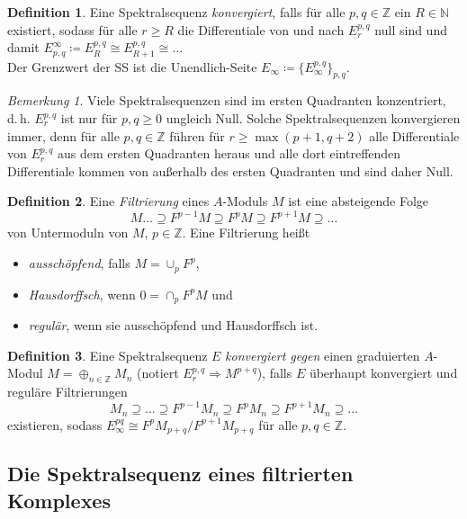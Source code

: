 \documentclass[11pt, a4paper, german]{article}
\theoremstyle{definition}
\newtheorem*{defn}{Definition}
\theoremstyle{remark}
\newtheorem*{bem}{Bemerkung}
\newcommand{\N}{\mathbb{N}} %
\newcommand{\Z}{\mathbb{Z}} %
\renewcommand{\dh}{d.\,h.} %
\begin{document}
\begin{defn}
  Eine Spektralsequenz \emph{konvergiert}, falls für alle $p, q \in \Z$ ein $R \in \N$ existiert, sodass für alle $r \geq R$ die Differentiale von und nach $E_r^{p,q}$ null sind und damit $E^\infty_{p,q} \coloneqq E_R^{p,q} \cong E_{R+1}^{p,q} \cong \ldots$ \\[2pt]
  Der Grenzwert der SS ist die Unendlich-Seite $E_\infty \coloneqq \{ E_\infty^{p,q} \}_{p,q}$.
\end{defn}

\begin{bem}
  Viele Spektralsequenzen sind im ersten Quadranten konzentriert, \dh{} $E_r^{p,q}$ ist nur für $p, q \geq 0$ ungleich Null.
  Solche Spektralsequenzen konvergieren immer, denn für alle $p, q \in \Z$ führen für $r \geq \max(p+1, q+2)$ alle Differentiale von $E_r^{p,q}$ aus dem ersten Quadranten heraus und alle dort eintreffenden Differentiale kommen von außerhalb des ersten Quadranten und sind daher Null.
\end{bem}

\begin{defn}
  Eine \emph{Filtrierung} eines $A$-Moduls $M$ ist eine absteigende Folge
  \[ M \ldots \supseteq F^{p-1} M \supseteq F^p M \supseteq F^{p+1} M \supseteq \ldots \]
  von Untermoduln von $M$, $p \!\in\! \Z$.
  Eine Filtrierung heißt
  \begin{itemize}
    \item \emph{ausschöpfend}, falls $M = \cup_p F^p$,
    \item \emph{Hausdorffsch}, wenn $0 = \cap_p F^p M$ und
    \item \emph{regulär}, wenn sie ausschöpfend und Hausdorffsch ist.
  \end{itemize}
\end{defn}

\begin{defn}
  Eine Spektralsequenz $E$ \emph{konvergiert gegen} einen graduierten $A$-Modul $M = \oplus_{n \in \Z} M_n$ (notiert $E_r^{p,q} \Rightarrow M^{p+q}$), falls $E$ überhaupt konvergiert und reguläre Filtrierungen
  \[ M_n \supseteq \ldots \supseteq F^{p-1} M_n \supseteq F^p M_n \supseteq F^{p+1} M_n \supseteq \ldots \]
  existieren, sodass $E_\infty^{pq} \cong F^p M_{p+q} / F^{p+1} M_{p+q}$ für alle $p, q \in \Z$.
\end{defn}

\subsection{Die Spektralsequenz eines filtrierten Komplexes}
\end{document}
